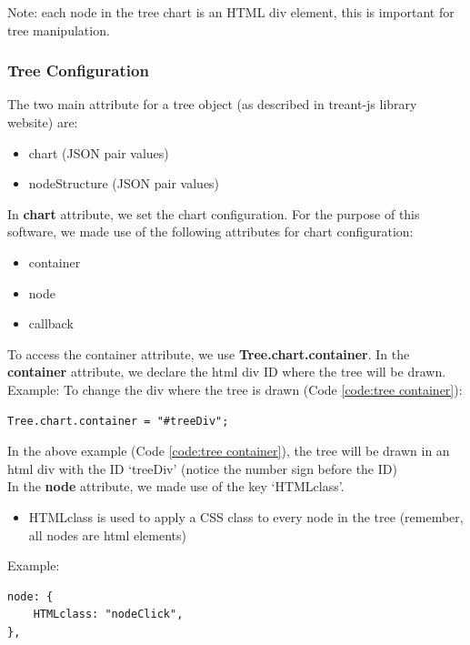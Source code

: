 \documentclass[11pt]{article} %
\begin{document}
\noindent Note: each node in the tree chart is an HTML div element, this is important for tree manipulation.

\subsubsection{Tree Configuration}\label{tree configuration}
The two main attribute for a tree object (as described in treant-js library website) are:
\begin{itemize}
\item chart (JSON pair values)
\item nodeStructure (JSON pair values)
\end{itemize}

\noindent
In \textbf{chart} attribute, we set the chart configuration. For the purpose of this software, we made use of the following attributes for chart configuration:

\begin{itemize}
\item container
\item node
\item callback
\end{itemize}

\noindent To access the container attribute, we use \textbf{Tree.chart.container}. In the \textbf{container} attribute, we declare the html div ID where the tree will be drawn.
Example: To change the div where the tree is drawn (Code \ref{code:tree container}):

\begin{lstlisting}[basicstyle=\scriptsize, tabsize=4, frame=single, caption= Tree container example, label=code:tree container]
Tree.chart.container = "#treeDiv";
\end{lstlisting}

\noindent In the above example (Code \ref{code:tree container}), the tree will be drawn in an html div with the ID `treeDiv' (notice the number sign before the ID)
\\[12pt]
\noindent In the \textbf{node} attribute, we made use of the key `HTMLclass'.

\begin{itemize}
\item HTMLclass is used to apply a CSS class to every node in the tree (remember, all nodes are html elements)
\end{itemize}

\noindent Example:
\begin{lstlisting}[basicstyle=\scriptsize, tabsize=4, frame=single, caption=Tree.node Example, label=code:tree.node example]
node: {
	HTMLclass: "nodeClick",
},
\end{lstlisting}
\end{document}
